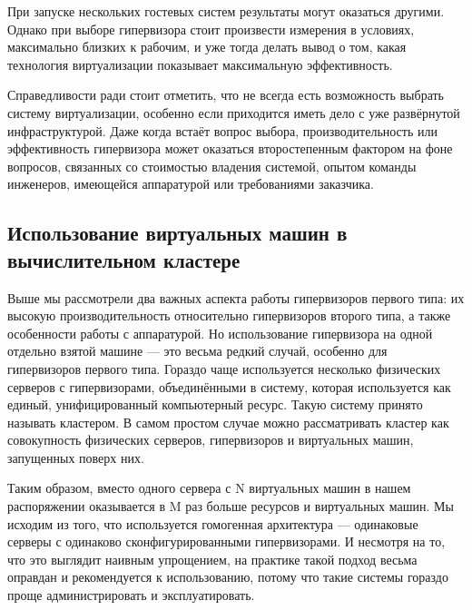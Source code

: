 \documentclass[14pt, a4paper]{article}
\begin{document}
При запуске нескольких гостевых систем результаты могут оказаться другими. Однако при выборе
гипервизора стоит произвести измерения в условиях, максимально близких к рабочим, и уже тогда
делать вывод о том, какая технология виртуализации показывает максимальную эффективность.

Справедливости ради стоит отметить, что не всегда есть возможность выбрать систему
виртуализации, особенно если приходится иметь дело с уже развёрнутой инфраструктурой. Даже
когда встаёт вопрос выбора, производительность или эффективность гипервизора может оказаться
второстепенным фактором на фоне вопросов, связанных со стоимостью владения системой, опытом
команды инженеров, имеющейся аппаратурой или требованиями заказчика.\\

\subsection*{Использование виртуальных машин в вычислительном кластере}

Выше мы рассмотрели два важных аспекта работы гипервизоров первого типа: их высокую
производительность относительно гипервизоров второго типа, а также особенности работы с
аппаратурой. Но использование гипервизора на одной отдельно взятой машине — это весьма редкий
случай, особенно для гипервизоров первого типа. Гораздо чаще используется несколько физических
серверов с гипервизорами, объединёнными в систему, которая используется как единый,
унифицированный компьютерный ресурс. Такую систему принято называть кластером. В самом
простом случае можно рассматривать кластер как совокупность физических серверов, гипервизоров и
виртуальных машин, запущенных поверх них.

\begin{figure}[h]%
    \centering
    \label{framework} %
\end{figure}

Таким образом, вместо одного сервера с N виртуальных машин в нашем распоряжении оказывается в
M раз больше ресурсов и виртуальных машин. Мы исходим из того, что используется гомогенная
архитектура — одинаковые серверы с одинаково сконфигурированными гипервизорами. И несмотря
на то, что это выглядит наивным упрощением, на практике такой подход весьма оправдан и
рекомендуется к использованию, потому что такие системы гораздо проще администрировать и
эксплуатировать.
\end{document}
